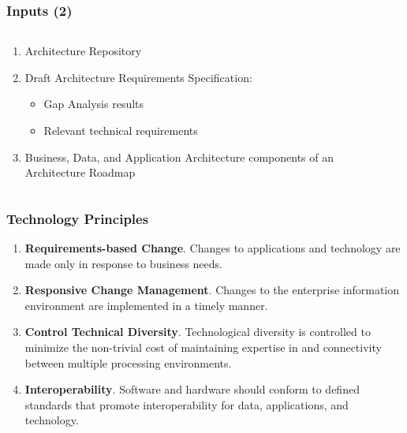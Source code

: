 \documentclass[aspectratio=169, table]{beamer}
\begin{document}
\begin{frame}
	\frametitle{Inputs (2)}
	\begin{columns}[onlytextwidth]
		\begin{column}{0.5\textwidth}
			\begin{enumerate}
				\item Architecture Repository
				\item Draft Architecture Requirements Specification:
				\begin{itemize}
					\item Gap Analysis results
					\item Relevant technical requirements
				\end{itemize}
				\item Business, Data, and Application Architecture components of an Architecture Roadmap
			\end{enumerate}
		\end{column}
		\begin{column}{0.5\textwidth}
			
		\end{column}
	\end{columns}
\end{frame}

\begin{frame}
	\frametitle{Technology Principles}
	\begin{enumerate}
		\item \textbf{Requirements-based Change}.
		Changes to applications and technology are made only in response to business needs.
		\item \textbf{Responsive Change Management}.
		Changes to the enterprise information environment are implemented in a timely manner.
		\item  \textbf{Control Technical Diversity}.
		Technological diversity is controlled to minimize the non-trivial cost of maintaining expertise in and connectivity between multiple processing environments.
		\item \textbf{Interoperability}. Software and hardware should conform to defined standards
		that promote interoperability for data, applications, and technology.
	\end{enumerate}
\end{frame}
\end{document}
